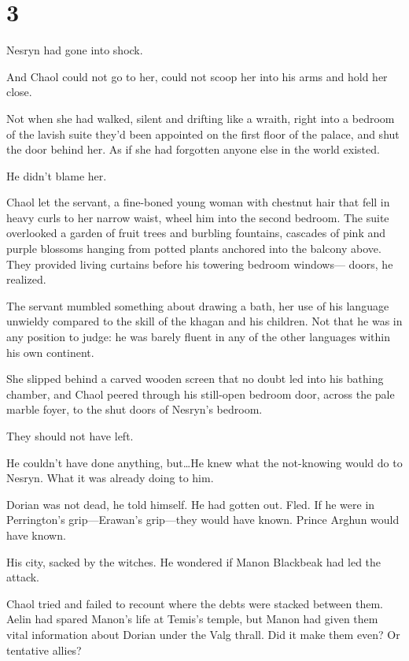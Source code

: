 
\chapter{3}

Nesryn had gone into shock.

And Chaol could not go to her, could not scoop her into his arms and hold her close.

Not when she had walked, silent and drifting like a wraith, right into a bedroom of the lavish suite they'd been appointed on the first floor of the palace, and shut the door behind her.
As if she had forgotten anyone else in the world existed.

He didn't blame her.

Chaol let the servant, a fine-boned young woman with chestnut hair that fell in heavy curls to her narrow waist, wheel him into the second bedroom.
The suite overlooked a garden of fruit trees and burbling fountains, cascades of pink and purple blossoms hanging from potted plants anchored into the balcony above.
They provided living curtains before his towering bedroom windows--- doors, he realized.

The servant mumbled something about drawing a bath, her use of his language unwieldy compared to the skill of the khagan and his children.
Not that he was in any position to judge: he was barely fluent in any of the other languages within his own continent.

She slipped behind a carved wooden screen that no doubt led into his bathing chamber, and Chaol peered through his still-open bedroom door, across the pale marble foyer, to the shut doors of Nesryn's bedroom.

They should not have left.

He couldn't have done anything, but\ldots He knew what the not-knowing would do to Nesryn.
What it was already doing to him.

Dorian was not dead, he told himself.
He had gotten out.
Fled.
If he were in Perrington's grip---Erawan's grip---they would have known.
Prince Arghun would have known.

His city, sacked by the witches.
He wondered if Manon Blackbeak had led the attack.

Chaol tried and failed to recount where the debts were stacked between them.
Aelin had spared Manon's life at Temis's temple, but Manon had given them vital information about Dorian under the Valg thrall.
Did it make them even?
Or tentative allies?

